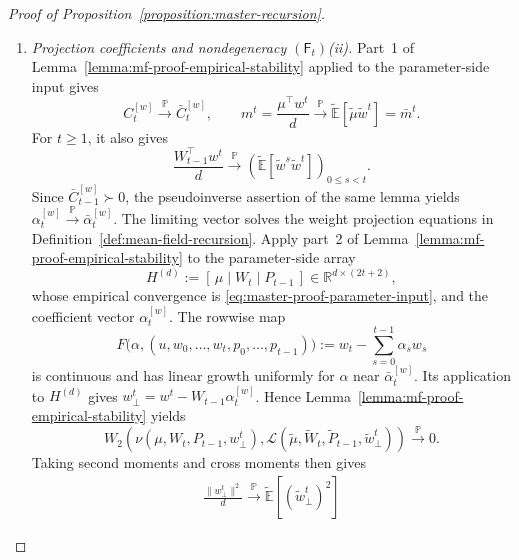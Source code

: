 \begin{proof}[Proof of Proposition~\ref{proposition:master-recursion}]
\begin{enumerate}[wide]
    \begin{enumerate}[label=(\alph*),wide]
        \item \emph{Projection coefficients and nondegeneracy $(\mathsf F_t)$\textup{(ii)}.}
        Part~1 of
        Lemma~\ref{lemma:mf-proof-empirical-stability}
        applied to the parameter-side input gives
        \[
            C_t^{[w]}
            \xrightarrow{\mathbb P}\bar C_t^{[w]},
            \qquad
            m^t
            =
            \frac{\mu^\top w^t}{d}
            \xrightarrow{\mathbb P}
            \tilde{\mathbb E}[\tilde\mu\tilde w^t]
            =
            \bar m^t.
        \]
        For $t\geq1$, it also gives
        \[
            \frac{W_{t-1}^\top w^t}{d}
            \xrightarrow{\mathbb P}
            \left(
                \tilde{\mathbb E}[\tilde w^s\tilde w^t]
            \right)_{0\leq s<t}.
        \]
        Since $\bar C_{t-1}^{[w]}\succ0$, the
        pseudoinverse assertion of the same lemma yields
        \(
            \alpha_t^{[w]}
            \xrightarrow{\mathbb P}\bar\alpha_t^{[w]}
        \).
        The limiting vector solves the weight projection
        equations in
        Definition~\ref{def:mean-field-recursion}.
        Apply part~2 of
        Lemma~\ref{lemma:mf-proof-empirical-stability}
        to the parameter-side array
        \[
            H^{(d)}
            :=
            [\,\mu\mid W_t\mid P_{t-1}\,]
            \in\mathbb R^{d\times(2t+2)},
        \]
        whose empirical convergence is
        \eqref{eq:master-proof-parameter-input},
        and the coefficient vector $\alpha_t^{[w]}$.
        The rowwise map
        \[
            F\bigl(\alpha,(u,w_0,\ldots,w_t,p_0,\ldots,p_{t-1})\bigr)
            :=
            w_t-\sum_{s=0}^{t-1}\alpha_s w_s
        \]
        is continuous and has linear growth uniformly for $\alpha$
        near $\bar\alpha_t^{[w]}$.
        Its application to $H^{(d)}$ gives
        \(
            w_\perp^t=w^t-W_{t-1}\alpha_t^{[w]}
        \).
        Hence Lemma~\ref{lemma:mf-proof-empirical-stability} yields
        \[
            W_2\left(
                \nu(\mu,W_t,P_{t-1},w_\perp^t),
                \mathscr L(
                    \tilde\mu,\tilde W_t,\tilde P_{t-1},
                    \tilde w_\perp^t
                )
            \right)
            \xrightarrow{\mathbb P}0.
        \]
        Taking second moments and cross moments then gives
        \[
        \begin{aligned}
            \frac{\|w_\perp^t\|^2}{d}
            \xrightarrow{\mathbb P}
            \tilde{\mathbb E}[(\tilde w_\perp^t)^2]

\end{aligned}\]
\end{enumerate}
\end{enumerate}
\end{proof}
